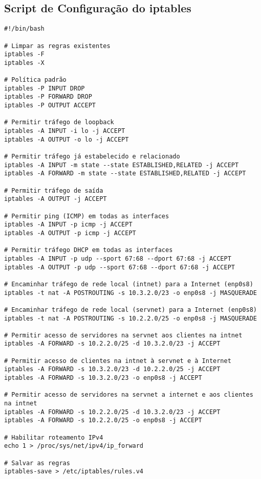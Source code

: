 \documentclass{article}
\begin{document}
\subsection{Script de Configuração do iptables}
\begin{verbatim}
#!/bin/bash

# Limpar as regras existentes
iptables -F
iptables -X

# Política padrão
iptables -P INPUT DROP
iptables -P FORWARD DROP
iptables -P OUTPUT ACCEPT

# Permitir tráfego de loopback
iptables -A INPUT -i lo -j ACCEPT
iptables -A OUTPUT -o lo -j ACCEPT

# Permitir tráfego já estabelecido e relacionado
iptables -A INPUT -m state --state ESTABLISHED,RELATED -j ACCEPT
iptables -A FORWARD -m state --state ESTABLISHED,RELATED -j ACCEPT

# Permitir tráfego de saída
iptables -A OUTPUT -j ACCEPT

# Permitir ping (ICMP) em todas as interfaces
iptables -A INPUT -p icmp -j ACCEPT
iptables -A OUTPUT -p icmp -j ACCEPT

# Permitir tráfego DHCP em todas as interfaces
iptables -A INPUT -p udp --sport 67:68 --dport 67:68 -j ACCEPT
iptables -A OUTPUT -p udp --sport 67:68 --dport 67:68 -j ACCEPT

# Encaminhar tráfego de rede local (intnet) para a Internet (enp0s8)
iptables -t nat -A POSTROUTING -s 10.3.2.0/23 -o enp0s8 -j MASQUERADE

# Encaminhar tráfego de rede local (servnet) para a Internet (enp0s8)
iptables -t nat -A POSTROUTING -s 10.2.2.0/25 -o enp0s8 -j MASQUERADE

# Permitir acesso de servidores na servnet aos clientes na intnet
iptables -A FORWARD -s 10.2.2.0/25 -d 10.3.2.0/23 -j ACCEPT

# Permitir acesso de clientes na intnet à servnet e à Internet
iptables -A FORWARD -s 10.3.2.0/23 -d 10.2.2.0/25 -j ACCEPT
iptables -A FORWARD -s 10.3.2.0/23 -o enp0s8 -j ACCEPT

# Permitir acesso de servidores na servnet a internet e aos clientes na intnet
iptables -A FORWARD -s 10.2.2.0/25 -d 10.3.2.0/23 -j ACCEPT
iptables -A FORWARD -s 10.2.2.0/25 -o enp0s8 -j ACCEPT

# Habilitar roteamento IPv4
echo 1 > /proc/sys/net/ipv4/ip_forward

# Salvar as regras
iptables-save > /etc/iptables/rules.v4
\end{verbatim}
\end{document}
